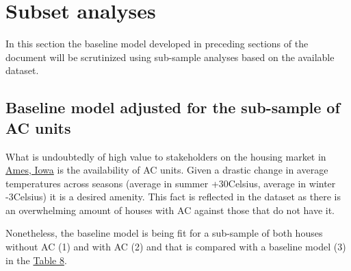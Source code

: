 \documentclass{article}
\begin{document}
\section{Subset analyses}

In this section the baseline model developed in preceding sections of the document will be scrutinized using sub-sample analyses based on the available dataset.

\subsection{Baseline model adjusted for the sub-sample of AC units}

What is undoubtedly of high value to stakeholders on the housing market in \href{https://www.google.com/maps/place/Ames,+IA,+USA/@42.0258192,-93.6964165,12z/data=!4m13!1m7!3m6!1s0x87ee70624634a06b:0x273156083cc75200!2sAmes,+IA,+USA!3b1!8m2!3d42.0307812!4d-93.6319131!3m4!1s0x87ee70624634a06b:0x273156083cc75200!8m2!3d42.0307812!4d-93.6319131}{Ames, Iowa} is the availability of AC units. Given a drastic change in average temperatures across seasons (average in summer +30Celsius, average in winter -3Celsius) it is a desired amenity. This fact is reflected in the dataset as there is an overwhelming amount of houses with AC against those that do not have it. 

Nonetheless, the baseline model is being fit for a sub-sample of both houses without AC (1) and with AC (2) and that is compared with a baseline model (3) in the \hyperref[tab:acunits]{Table 8}.
\end{document}
